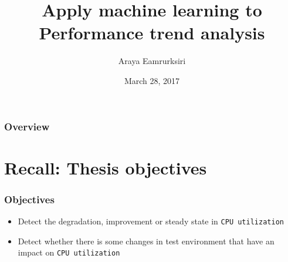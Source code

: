 \documentclass{beamer}
\title[Midterm report]{Apply machine learning to Performance trend analysis} %
\author{Araya Eamrurksiri} %
\institute[] %
{
 \\ %
\medskip
\textit{} %
}
\date{March 28, 2017} %
\begin{document}
\begin{frame}
\titlepage %
\end{frame}

\begin{frame}
\frametitle{Overview} %
\tableofcontents %
\end{frame}


\section{Recall: Thesis objectives}
\begin{frame}
\frametitle{Objectives}
\begin{itemize}
	\item Detect the degradation, improvement or steady state in \texttt{CPU utilization}
	\item Detect whether there is some changes in test environment that have an impact on \texttt{CPU utilization}
\end{itemize}
\end{frame}

\end{document}
